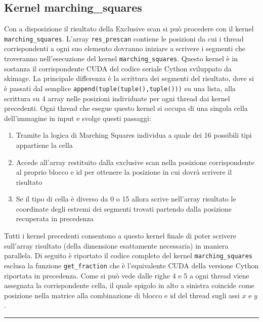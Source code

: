\documentclass[12pt,a4paper]{report}
\begin{document}
\subsection{Kernel marching\_squares}
Con a disposizione il risultato della Exclusive scan si può procedere con il kernel \verb|marching_squares|. \newline
L'array \verb|res_prescan| contiene le posizioni da cui i thread corrispondenti a ogni suo elemento dovranno iniziare a scrivere i segmenti che troveranno nell'esecuzione del kernel \verb|marching_squares|. 
Questo kernel è in sostanza il corrispondente CUDA del codice seriale Cython sviluppato da skimage. La principale differenza è la scrittura dei segmenti del risultato, dove si è passati dal semplice \verb|append(tuple(tuple(),tuple()))| su una lista, alla scrittura su 4 array nelle posizioni individuate per ogni thread dai kernel precedenti. \newline
Ogni thread che esegue questo kernel si occupa di una singola cella dell'immagine in input e svolge questi passaggi:
\begin{enumerate}
\item Tramite la logica di Marching Squares individua a quale dei 16 possibili tipi appartiene la cella
\item Accede all'array restituito dalla exclusive scan nella posizione corrispondente al proprio blocco e id per ottenere la posizione in cui dovrà scrivere il risultato
\item Se il tipo di cella è diverso da 0 o 15 allora scrive nell'array risultato le coordinate degli estremi dei segmenti trovati partendo dalla posizione recuperata in precedenza
\end{enumerate}
Tutti i kernel precedenti consentono a questo kernel finale di poter scrivere sull'array risultato (della dimensione esattamente necessaria) in maniera parallela. \newline
Di seguito è riportato il codice completo del kernel \verb|marching_squares| esclusa la funzione \verb|get_fraction| che è l'equivalente CUDA della versione Cython riportata in precedenza. \newline
Come si può vede dalle righe 4 e 5 a ogni thread viene assegnata la corrispondente cella, il quale spigolo in alto a sinistra coincide come posizione nella matrice alla combinazione di blocco e id del thread sugli assi $x$ e $y$.
\newpage
\noindent\rule[0.5ex]{\linewidth}{2pt}
\end{document}
